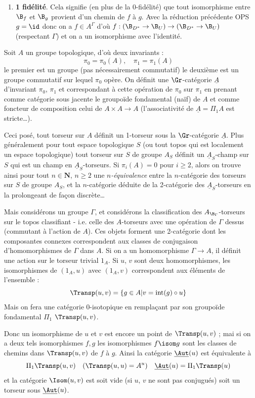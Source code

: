 \begin{enumerate}
    \item[b)] {\bf 1 fidélité}. Cela signifie (en plus de la 0-fidélité) que tout isomorphisme entre $\B_f$ et $\B_g$ provient d'un chemin de $f$ à $g$. Avec la réduction précédente OPS $g = \id$ donc on a $f \in A^\Gamma$ d'où $f: (\B_{D^*} \to \B_U) \to (\B_{D^*} \to \B_U)$ (respectant $\Gamma$) et on a un isomorphisme avec l'identité.
\end{enumerate}
Soit $A$ un groupe topologique, d'où deux invariants :
$$
\pi_0 = \pi_0 (A), \quad \pi_1 = \pi_1(A)
$$
le premier est un groupe (pas nécessairement commutatif) le deuxième est un groupe commutatif sur lequel $\pi_0$ opère. On définit une $\Gr$-catégorie $\underline{A}$ d'invariant $\pi_0$, $\pi_1$ et correspondant à cette opération de $\pi_0$ sur $\pi_1$ en prenant comme catégorie sous jacente le groupoïde fondamental (naïf) de $A$ et comme foncteur de composition celui de $A \times A \to A$ (l'associativité de $\underline{A} = \Pi_1 A$ est stricte\dots).

Ceci posé, tout torseur sur $A$ définit un 1-torseur sous la $\Gr$-catégorie $\underline{A}$. Plus généralement pour tout espace topologique $S$ (ou tout topos qui est localement un espace topologique) tout torseur sur $S$ de groupe $A_S$ définit un $\underline{A}_S$-champ sur $S$ qui est un champ en $\underline{A}_S$-torseurs. Si $\pi_i (A) = 0$ pour $i \geq 2$, alors on trouve ainsi pour tout $n \in \mathbf{N}$, $n \geq 2$ une \emph{$n$-équivalence} entre la $n$-catégorie des torseurs sur $S$ de groupe $A_S$, et la $n$-catégorie déduite de la 2-catégorie des $\underline{A}_S$-torseurs en la prolongeant de fa\c{c}on discrète\dots 

Mais considérons un groupe $\Gamma$, et considérons la classification des $A_{\B_\Gamma}$-torseurs sur le topos classifiant - i.e. celle des $A$-torseurs avec une opération de $\Gamma$ dessus (commutant à l'action de $A$). Ces objets forment une 2-catégorie dont les composantes connexes correspondent aux classes de conjugaison d'homomorphismes de $\Gamma$ dans $A$. Si on a un homomorphisme $\Gamma \to A$, il définit une action sur le torseur trivial $1_A$. Si $u$, $v$ sont deux homomorphismes, les isomorphismes de $(1_A, u)$ avec $(1_A, v)$ correspondent aux éléments de l'ensemble :
$$
\Transp (u, v) = \{ g \in A | v = \text{int}(g) \circ u \}
$$
Mais on fera une catégorie 0-isotopique en rempla\c{c}ant par son groupoïde fondamental $\Pi_1$ $\Transp (u, v)$. 

Donc un isomorphisme de $u$ et $v$ est encore un point de $\Transp (u, v)$ ; mai si on a deux tels isomorphismes $f, g$ les isomorphismes $f \isom g$ sont les classes de chemins dans $\Transp (u, v)$ de $f$ à $g$. Ainsi la catégorie $\underline{\Aut}(u)$ est équivalente à
$$
\Pi_1 \Transp (u, v) \quad (\Transp (u, u) = A^u) \quad \underline{\Aut}(u) = \Pi_1 \Transp (u)
$$
et la catégorie $\Isom (u, v)$ est soit vide (si $u$, $v$ ne sont pas conjugués) soit un torseur sous $\underline{\Aut}(u)$.

